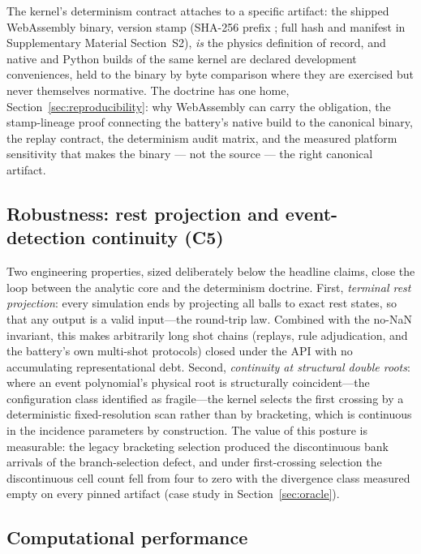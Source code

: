 The kernel's determinism contract attaches to a specific artifact: the
shipped WebAssembly binary, version stamp  (SHA-256
prefix ; full hash and manifest in Supplementary Material
Section~S2), \emph{is} the physics definition of record, and native and
Python builds of the same kernel are declared development conveniences,
held to the binary by byte comparison where they are exercised but never
themselves normative. The doctrine has one home,
Section~\ref{sec:reproducibility}: why WebAssembly can carry the
obligation, the stamp-lineage proof connecting the battery's native
build to the canonical binary, the replay contract, the determinism
audit matrix, and the measured platform sensitivity that makes the
binary --- not the source --- the right canonical artifact.

\subsection{Robustness: rest projection and event-detection continuity (C5)}
\label{sec:simulator-robustness}

Two engineering properties, sized deliberately below the headline claims,
close the loop between the analytic core and the determinism doctrine.
First, \emph{terminal rest projection}: every simulation ends by projecting
all balls to exact rest states, so that any  output is a
valid  input---the round-trip law. Combined with the no-NaN
invariant, this makes arbitrarily long shot chains (replays, rule
adjudication, and the battery's own multi-shot protocols) closed under the
API with no accumulating representational debt. Second, \emph{continuity
at structural double roots}: where an event polynomial's physical root is
structurally coincident---the configuration class
\citet{leckie2006event} identified as fragile---the kernel selects the
first crossing by a deterministic fixed-resolution scan rather than by
bracketing, which is continuous in the incidence parameters by
construction. The value of this posture is measurable: the legacy
bracketing selection produced the discontinuous bank arrivals of the
branch-selection defect, and under first-crossing selection the
discontinuous cell count fell
from four to zero with the divergence class measured empty on every pinned
artifact (case study in
Section~\ref{sec:oracle}).

\subsection{Computational performance}
\label{sec:simulator-performance}

